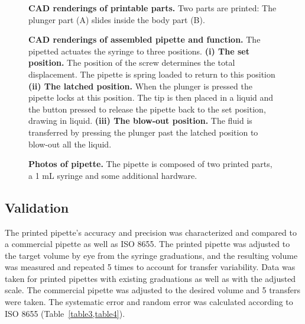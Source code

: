 \documentclass[10pt,letterpaper]{article}
\begin{document}
\begin{figure}
\caption{
{\bf CAD renderings of printable parts.} Two parts are printed: The plunger part (A) slides inside the body part (B).
}
\label{fig1}
\end{figure}

\begin{figure}
\caption{
{\bf CAD renderings of assembled pipette and function.} The pipetted actuates the syringe to three positions. {\bf(i) The set position.} The position of the screw determines the total displacement. The pipette is spring loaded to return to this position {\bf (ii) The latched position.} When the plunger is pressed the pipette locks at this position. The tip is then placed in a liquid and the button pressed to release the pipette back to the set position, drawing in liquid. {\bf (iii) The blow-out position.} The fluid is transferred by pressing the plunger past the latched position to blow-out all the liquid.  
}
\label{fig1}
\end{figure}

\begin{figure}
\caption{
{\bf Photos of pipette.}  The pipette is composed of two printed parts, a 1 mL syringe and some additional hardware.  
}
\label{fig3}
\end{figure}

\subsection*{Validation}
The printed pipette’s accuracy and precision was characterized and compared to a commercial pipette as well as ISO 8655.
The printed pipette was adjusted to the target volume by eye from the syringe graduations, and the resulting volume was measured and repeated 5 times to account for transfer variability.
Data was taken for printed pipettes with existing graduations as well as with the adjusted scale.
The commercial pipette was adjusted to the desired volume and 5 transfers were taken.
The systematic error and random error was calculated according to ISO 8655 (Table~\ref{table3,table4}).

\end{document}
